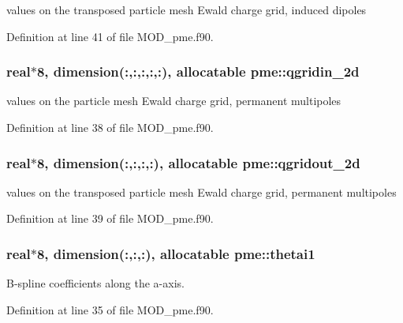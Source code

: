 values on the transposed particle mesh Ewald charge grid, induced dipoles 



Definition at line 41 of file M\-O\-D\-\_\-pme.\-f90.

\hypertarget{classpme_ab9bda6ccbc8e57a3a5a0959234b511d3}{
\subsubsection[{qgridin\-\_\-2d}]{\setlength{\rightskip}{0pt plus 5cm}real$\ast$8, dimension(\-:,\-:,\-:,\-:,\-:), allocatable pme\-::qgridin\-\_\-2d}}\label{classpme_ab9bda6ccbc8e57a3a5a0959234b511d3}


values on the particle mesh Ewald charge grid, permanent multipoles 



Definition at line 38 of file M\-O\-D\-\_\-pme.\-f90.

\hypertarget{classpme_a5aee9bc96e7fac94aa9f0773f1fadea1}{
\subsubsection[{qgridout\-\_\-2d}]{\setlength{\rightskip}{0pt plus 5cm}real$\ast$8, dimension(\-:,\-:,\-:,\-:), allocatable pme\-::qgridout\-\_\-2d}}\label{classpme_a5aee9bc96e7fac94aa9f0773f1fadea1}


values on the transposed particle mesh Ewald charge grid, permanent multipoles 



Definition at line 39 of file M\-O\-D\-\_\-pme.\-f90.

\hypertarget{classpme_a8310f8e14534feef7810430c5398214b}{
\subsubsection[{thetai1}]{\setlength{\rightskip}{0pt plus 5cm}real$\ast$8, dimension(\-:,\-:,\-:), allocatable pme\-::thetai1}}\label{classpme_a8310f8e14534feef7810430c5398214b}


B-\/spline coefficients along the a-\/axis. 



Definition at line 35 of file M\-O\-D\-\_\-pme.\-f90.

